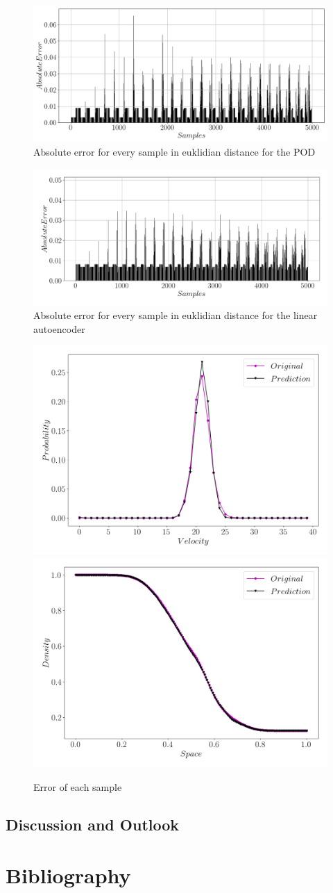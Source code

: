 \documentclass[12pt, a4paper]{article}
\begin{document}
\begin{figure}[htb!]
	\centering
	\includegraphics[width=\textwidth]{Figures/Error_samples_SVD.png}
	\caption{Absolute error for every sample in euklidian distance for the POD}
	\label{Fig:Error_samples_svd}
\end{figure}
\begin{figure}[htb!]
	\centering
	\includegraphics[width=\textwidth]{Figures/Error_samples_v1_1.png}
	\caption{Absolute error for every sample in euklidian distance for the linear autoencoder}
	\label{Fig:error_sample}
\end{figure} 
\begin{figure}[htb!]
	\centering
	\includegraphics[width=.49\textwidth]{Figures/Sample500_v1_1.png}
	\includegraphics[width=.49\textwidth]{Figures/Density_last_v1_1.png}
	\caption{Error of each sample}
	\label{Fig:Errormore}
\end{figure}
\subsection{Discussion and Outlook}
\section{Bibliography}
{}

\end{document}
